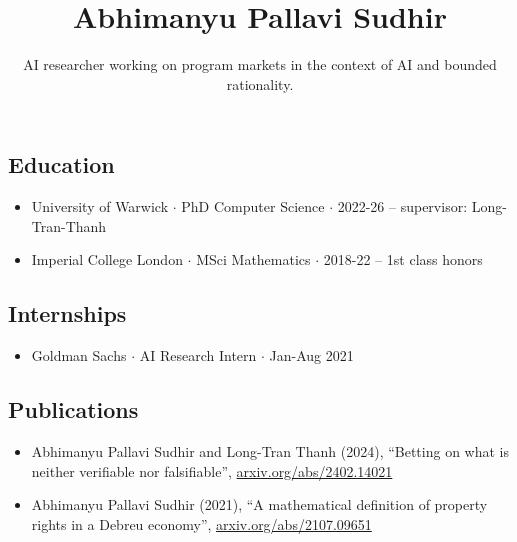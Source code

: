 \documentclass{article}
\title{\Large\bf Abhimanyu Pallavi Sudhir}
\subtitle{AI researcher working on program markets in the context of AI and bounded rationality. \\ %
\vspace{-2em}}
\begin{document}
\begingroup
\let\center\flushleft
\let\endcenter\endflushleft
\maketitle
\endgroup


\subsection*{Education}
\begin{itemize}
    \item University of Warwick $\cdot$ PhD Computer Science $\cdot$ 2022-26 -- supervisor: Long-Tran-Thanh %
    \item Imperial College London $\cdot$ MSci Mathematics $\cdot$ 2018-22 -- 1st class honors
\end{itemize}

\subsection*{Internships}
\begin{itemize}
    \item Goldman Sachs $\cdot$ AI Research Intern $\cdot$ Jan-Aug 2021%
\end{itemize}


\subsection*{Publications}

\begin{itemize}

\item 
Abhimanyu Pallavi Sudhir and Long-Tran Thanh (2024), ``Betting on what is neither verifiable nor falsifiable'', \href{https://arxiv.org/abs/2402.14021}{arxiv.org/abs/2402.14021}

\item
Abhimanyu Pallavi Sudhir (2021),
``A mathematical definition of property rights in a Debreu economy'', 
\href{https://arxiv.org/abs/2107.09651}{arxiv.org/abs/2107.09651}

\end{itemize}
\end{document}
